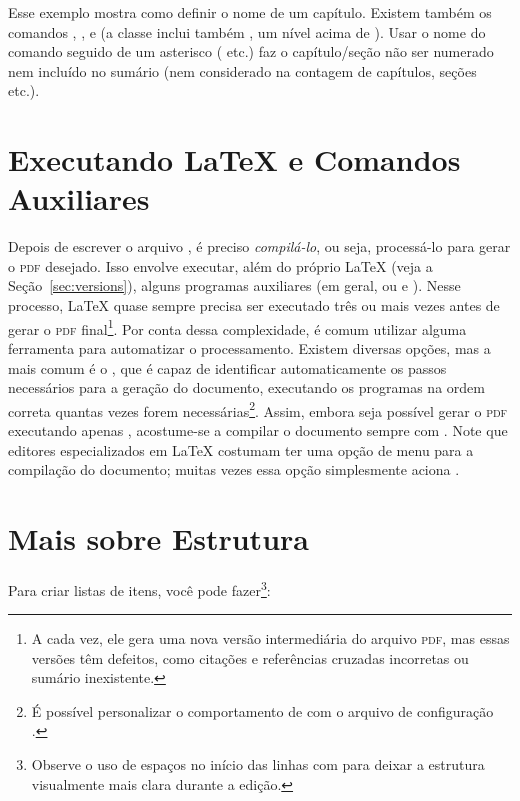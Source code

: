 Esse exemplo mostra como definir o nome de um capítulo. Existem também os
comandos , ,  e
 (a classe  inclui também , um nível
acima de ). Usar o nome do comando seguido de um asterisco
( etc.) faz o capítulo/seção não ser numerado nem incluído
no sumário (nem considerado na contagem de capítulos, seções etc.).

\section{Executando \LaTeX{} e Comandos Auxiliares}

Depois de escrever o arquivo , é preciso \emph{compilá-lo}, ou
seja, processá-lo para gerar o \textsc{pdf} desejado. Isso envolve executar,
além do próprio \LaTeX{} (veja a Seção~\ref{sec:versions}), alguns
programas auxiliares (em geral,  ou  e
). Nesse processo, \LaTeX{} quase sempre precisa ser
executado três ou mais vezes antes de gerar o \textsc{pdf} final\footnote{A
cada vez, ele gera uma nova versão intermediária do arquivo \textsc{pdf},
mas essas versões têm defeitos, como citações e referências cruzadas
incorretas ou sumário inexistente.}. Por conta dessa complexidade, é comum
utilizar alguma ferramenta para automatizar o processamento. Existem diversas
opções, mas a mais comum é o , que é capaz de identificar
automaticamente os passos necessários para a geração do documento,
executando os programas na ordem correta quantas vezes forem
necessárias\footnote{É possível personalizar o comportamento de 
com o arquivo de configuração .}. Assim, embora seja possível
gerar o \textsc{pdf} executando apenas ,
acostume-se a compilar o documento sempre com .
Note que editores especializados em \LaTeX{} costumam ter uma opção de menu
para a compilação do documento; muitas vezes essa opção simplesmente aciona
.

\section{Mais sobre Estrutura}

Para criar listas de itens, você pode fazer\footnote{Observe o uso de
espaços no início das linhas com  para deixar a
estrutura visualmente mais clara durante a edição.}:

